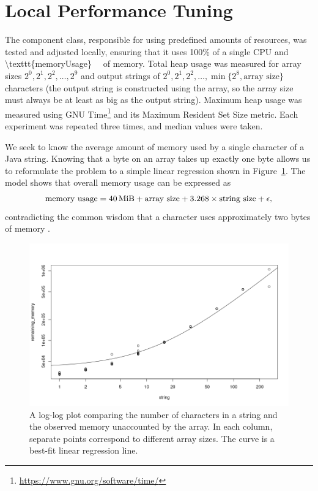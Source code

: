 \documentclass{article}
\begin{document}
\section{Local Performance Tuning} \label{sec:adjustments}

The component class, responsible for using predefined amounts of resources, was
tested and adjusted locally, ensuring that it uses 100\% of a single CPU and
\SI[number-math-rm = \mathnormal, parse-numbers =
false]{\texttt{memoryUsage}}{\mebi\byte} of memory. Total heap usage was
measured for array sizes $2^0, 2^1, 2^2, \dots, 2^9$ and output strings of $2^0,
2^1, 2^2, \dots, \min \{ 2^8, \text{array size} \}$ characters (the output
string is constructed using the array, so the array size must always be at least
as big as the output string). Maximum heap usage was measured using GNU
Time\footnote{\url{https://www.gnu.org/software/time/}} and its Maximum Resident
Set Size metric. Each experiment was repeated three times, and median values
were taken.

We seek to know the average amount of memory used by a single character of a
Java string. Knowing that a byte on an array takes up exactly one byte allows us
to reformulate the problem to a simple linear regression shown in
Figure~\ref{fig:regression1}. The model shows that overall memory usage can be
expressed as
\begin{equation} \label{eq:regression}
  \text{memory usage} = \SI{40}{\mebi\byte} + \text{array size} + 3.268 \times
  \text{string size} + \epsilon,
\end{equation}
contradicting the common wisdom that a character uses approximately two bytes of
memory \cite{java_memory}.

\begin{figure}
  \centering
  \includegraphics[width=\textwidth]{../proof_of_concept/prediction2.png}
  \caption{A log-log plot comparing the number of characters in a string and the
  observed memory unaccounted by the array. In each column, separate points
  correspond to different array sizes. The curve is a best-fit linear regression
  line.}
  \label{fig:regression1}
\end{figure}
\end{document}
